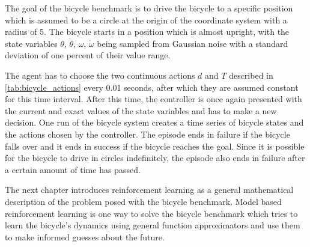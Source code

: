 The goal of the bicycle benchmark is to drive the bicycle to a specific position which is assumed to be a circle at the origin of the coordinate system with a radius of 5.
The bicycle starts in a position which is almost upright, with the state variables $\theta$, $\dot{\theta}$, $\omega$, $\dot{\omega}$ being sampled from Gaussian noise with a standard deviation of one percent of their value range.

The agent has to choose the two continuous actions $d$ and $T$ described in \cref{tab:bicycle_actions} every 0.01 seconds, after which they are assumed constant for this time interval.
After this time, the controller is once again presented with the current and exact values of the state variables and has to make a new decision.
One run of the bicycle system creates a time series of bicycle states and the actions chosen by the controller.
The episode ends in failure if the bicycle falls over and it ends in success if the bicycle reaches the goal.
Since it is possible for the bicycle to drive in circles indefinitely, the episode also ends in failure after a certain amount of time has passed.

The next chapter introduces reinforcement learning as a general mathematical description of the problem posed with the bicycle benchmark.
Model based reinforcement learning is one way to solve the bicycle benchmark which tries to learn the bicycle's dynamics using general function approximators and use them to make informed guesses about the future.
